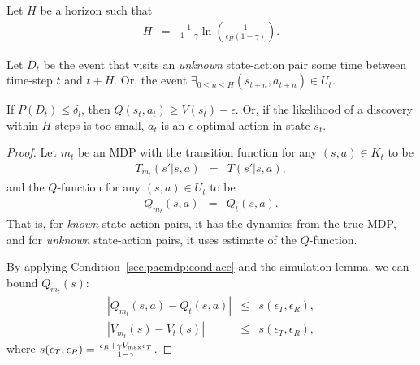 Let $H$ be a horizon such that
\begin{eqnarray}
H&=&\frac 1 {1-\gamma} \ln\left(\frac 1 {\epsilon_H (1-\gamma)}\right).
\end{eqnarray}

Let $D_t$ be the event that \A visits an \emph{unknown} state-action pair some time between time-step $t$ and $t+H$. Or, the event $\exists_{0\leq n\leq H} (s_{t+n},a_{t+n}) \in U_t$.

\begin{lemma}
If $P(D_t) \leq \delta_l$, then $Q(s_t,a_t) \geq V(s_t) - \epsilon$. Or, if the likelihood of a discovery within $H$ steps is too small, $a_t$ is an $\epsilon$-optimal action in state $s_t$.
\end{lemma}

\begin{proof}

Let $m_t$ be an MDP with the transition function for any $(s,a) \in K_t$ to be
\begin{eqnarray}
T_{m_t}(s'|s,a) &=& T(s'|s,a),
\end{eqnarray}
and the $Q$-function for any $(s,a) \in U_t$ to be
\begin{eqnarray}
Q_{m_t}(s,a) &=& Q_t(s,a).
\end{eqnarray}
That is, for \emph{known} state-action pairs, it has the dynamics from the true MDP, and for \emph{unknown} state-action pairs, it uses \As estimate of the $Q$-function.

By applying Condition~\ref{sec:pacmdp:cond:acc} and the simulation lemma, we can bound $Q_{m_t}(s)$:
\begin{eqnarray}
|Q_{m_t}(s,a) - Q_t(s,a)| &\leq& s(\epsilon_T,\epsilon_R),\\
|V_{m_t}(s) - V_t(s)| &\leq& s(\epsilon_T,\epsilon_R),
\end{eqnarray}
where $s(\epsilon_T,\epsilon_R) = \frac{ \epsilon_R + \gamma V_{\rm max}\epsilon_T }{1-\gamma}$.


\end{proof}
